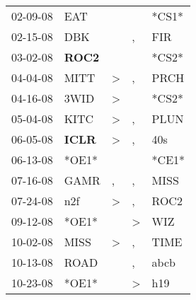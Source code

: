 \begin{supertabular}{p{0.07\textwidth}p{0.06\textwidth}p{0.02\textwidth}p{0.02\textwidth}p{0.06\textwidth}}
          02-09-08\textsuperscript{} &            EAT\textsuperscript{} &                  &                  &                            *CS1* \\
          02-15-08\textsuperscript{} &            DBK\textsuperscript{} &                  &                , &            FIR\textsuperscript{} \\
          03-02-08\textsuperscript{} &  \textbf{ROC2\textsuperscript{}} &                  &                  &                            *CS2* \\
          04-04-08\textsuperscript{} &           MITT\textsuperscript{} &     \textgreater &                , &           PRCH\textsuperscript{} \\
          04-16-08\textsuperscript{} &           3WID\textsuperscript{} &     \textgreater &                  &                            *CS2* \\
          05-04-08\textsuperscript{} &           KITC\textsuperscript{} &     \textgreater &                , &           PLUN\textsuperscript{} \\
          06-05-08\textsuperscript{} &  \textbf{ICLR\textsuperscript{}} &     \textgreater &                , &            40s\textsuperscript{} \\
          06-13-08\textsuperscript{} &                            *OE1* &                  &                  &                            *CE1* \\
          07-16-08\textsuperscript{} &           GAMR\textsuperscript{} &                , &                , &           MISS\textsuperscript{} \\
          07-24-08\textsuperscript{} &            n2f\textsuperscript{} &     \textgreater &                , &           ROC2\textsuperscript{} \\
          09-12-08\textsuperscript{} &                            *OE1* &                  &     \textgreater &            WIZ\textsuperscript{} \\
          10-02-08\textsuperscript{} &           MISS\textsuperscript{} &     \textgreater &                , &           TIME\textsuperscript{} \\
          10-13-08\textsuperscript{} &           ROAD\textsuperscript{} &                  &                , &           abcb\textsuperscript{} \\
          10-23-08\textsuperscript{} &                            *OE1* &                  &     \textgreater &            h19\textsuperscript{} \\

\end{supertabular}
